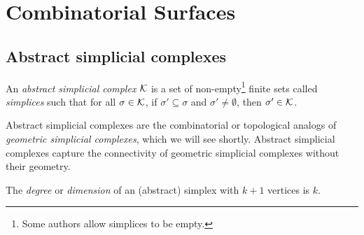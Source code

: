 \chapter{Combinatorial Surfaces}
\label{chap:combinatorial_surfaces}

\section{Abstract simplicial complexes}

\begin{definition}\label{def:abstract_simplicial_complex}
    \leanok
    An \emph{abstract simplicial complex} $\mathcal{K}$ is a set of non-empty\footnote{Some authors allow simplices to be empty.} finite sets called \emph{simplices} such that
    for all $\sigma \in \mathcal{K}$, 
    if $\sigma' \subseteq \sigma$ 
    and $\sigma' \neq \emptyset$,
    then $\sigma' \in \mathcal{K}$.
\begin{comment}
    An \emph{abstract simplicial complex} is a pair $(V,\K)$, 
    where $V$ is a set, 
    $\K \subseteq \Pow(V)$ is a set of finite %
    subsets of $V$, 
    and for all $\sigma \in \K$, 
    if $\sigma' \subseteq \sigma$ 
    then $\sigma' \in \K$. 
    $V$ is called the set of \emph{vertices} 
    and elements of $\K$ are called \emph{simplices}.
\end{comment}
\end{definition}

Abstract simplicial complexes are the combinatorial or topological analogs of \emph{geometric simplicial complexes}, which we will see shortly. Abstract simplicial complexes capture the connectivity of geometric simplicial complexes without their geometry.

\begin{comment}
\begin{definition}\label{def:abstract_simplex}
    \uses{def:abstract_simplicial_complex}
    \leanok
    \lean{abstract_simplicial_complex.abstract_simplex}
    Let $\K$ %
    be a finite simplicial complex. 
    For $k \in \N$, an \emph{abstract $k$-simplex} is 
    a simplex $\sigma \in \K$ consisting of exactly $k+1$ vertices.
\end{definition}
\end{comment}

\begin{definition}\label{def:degree}
    The \emph{degree} or \emph{dimension} of an (abstract) simplex with $k+1$ vertices is $k$. 
\end{definition}

